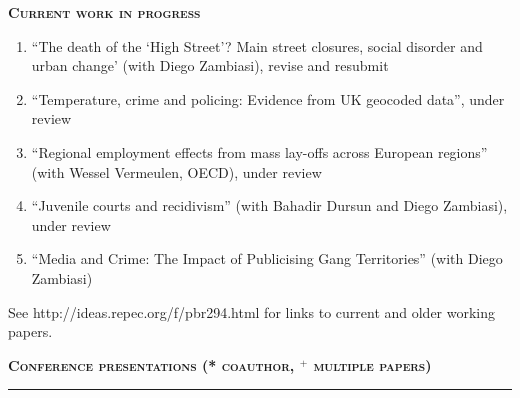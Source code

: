 \documentclass[10pt,pdftex,a4paper,oneside]{article}
\begin{document}
\textbf{\textsc{Current work in progress}}
\begin{enumerate}
\item ``The death of the `High Street'? Main street closures, social disorder and urban change' (with Diego Zambiasi), revise and resubmit %
\item ``Temperature, crime and policing: Evidence from UK geocoded data'', under review %
\item ``Regional employment effects from mass lay-offs across European regions'' (with Wessel Vermeulen, OECD), under review %
\item ``Juvenile courts and recidivism'' (with Bahadir Dursun and Diego Zambiasi), under review %
\item ``Media and Crime: The Impact of Publicising Gang Territories'' (with Diego Zambiasi)%
\end{enumerate}
See http://ideas.repec.org/f/pbr294.html for links to current and older working papers.

\textbf{\textsc{Conference presentations (* coauthor, $^+$ multiple papers)}}
\vspace{.5ex}
\hrule
\end{document}
